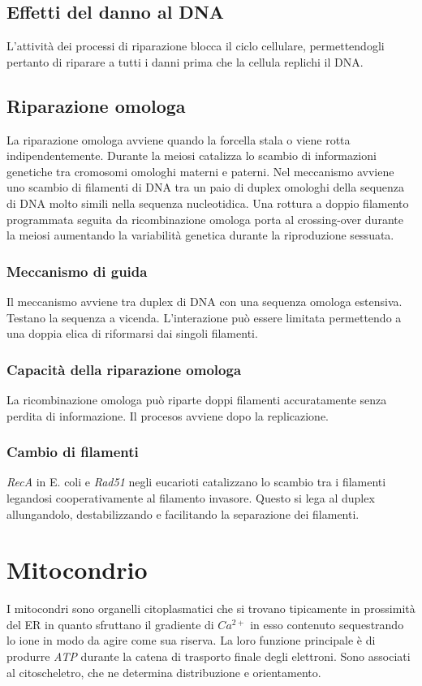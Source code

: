 	\subsection{Effetti del danno al DNA}
	L'attivit\`a dei processi di riparazione blocca il ciclo cellulare, permettendogli pertanto di riparare a tutti i danni prima che la cellula replichi il DNA.

	\subsection{Riparazione omologa}
	La riparazione omologa avviene quando la forcella stala o viene rotta indipendentemente.
	Durante la meiosi catalizza lo scambio di informazioni genetiche tra cromosomi omologhi materni e paterni.
	Nel meccanismo avviene uno scambio di filamenti di DNA tra un paio di duplex omologhi della sequenza di DNA molto simili nella sequenza nucleotidica.
	Una rottura a doppio filamento programmata seguita da ricombinazione omologa porta al crossing-over durante la meiosi aumentando la variabilit\`a genetica durante la riproduzione sessuata.

		\subsubsection{Meccanismo di guida}
		Il meccanismo avviene tra duplex di DNA con una sequenza omologa estensiva.
		Testano la sequenza a vicenda.
		L'interazione pu\`o essere limitata permettendo a una doppia elica di riformarsi dai singoli filamenti.

		\subsubsection{Capacit\`a della riparazione omologa}
		La ricombinazione omologa pu\`o riparte doppi filamenti accuratamente senza perdita di informazione.
		Il procesos avviene dopo la replicazione.

		\subsubsection{Cambio di filamenti}
		\emph{RecA} in E. coli e \emph{Rad51} negli eucarioti catalizzano lo scambio tra i filamenti legandosi cooperativamente al filamento invasore.
		Questo si lega al duplex allungandolo, destabilizzando e facilitando la separazione dei filamenti.

\section{Mitocondrio}
I mitocondri sono organelli citoplasmatici che si trovano tipicamente in prossimit\`a del ER in quanto sfruttano il gradiente di \emph{$Ca^{2+}$} in esso contenuto sequestrando lo ione in modo da agire come sua riserva.
La loro funzione principale \`e di produrre \emph{ATP} durante la catena di trasporto finale degli elettroni.
Sono associati al citoscheletro, che ne determina distribuzione e orientamento.

